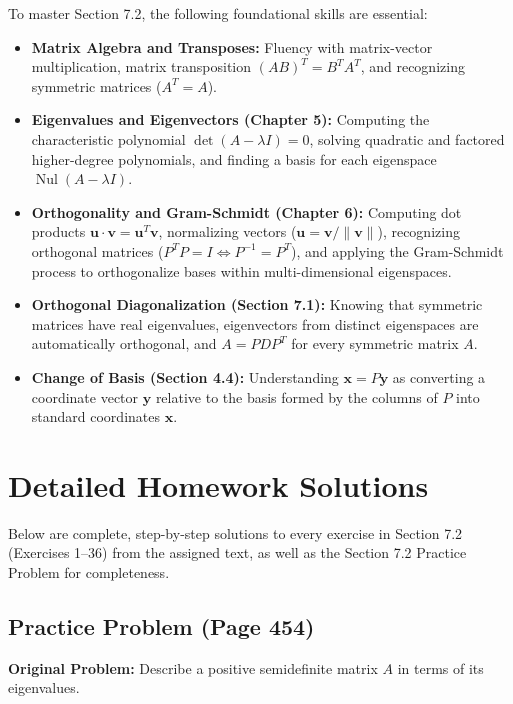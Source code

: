 \documentclass[11pt, letterpaper]{article}
\theoremstyle{definition}
\theoremstyle{remark}
\begin{document}
To master Section 7.2, the following foundational skills are essential:
\begin{itemize}
    \item \textbf{Matrix Algebra and Transposes:} Fluency with matrix-vector multiplication, matrix transposition $(AB)^T = B^T A^T$, and recognizing symmetric matrices ($A^T = A$).
    \item \textbf{Eigenvalues and Eigenvectors (Chapter 5):} Computing the characteristic polynomial $\det(A - \lambda I) = 0$, solving quadratic and factored higher-degree polynomials, and finding a basis for each eigenspace $\operatorname{Nul}(A - \lambda I)$.
    \item \textbf{Orthogonality and Gram-Schmidt (Chapter 6):} Computing dot products $\mathbf{u} \cdot \mathbf{v} = \mathbf{u}^T \mathbf{v}$, normalizing vectors ($\mathbf{u} = \mathbf{v}/\|\mathbf{v}\|$), recognizing orthogonal matrices ($P^T P = I \iff P^{-1} = P^T$), and applying the Gram-Schmidt process to orthogonalize bases within multi-dimensional eigenspaces.
    \item \textbf{Orthogonal Diagonalization (Section 7.1):} Knowing that symmetric matrices have real eigenvalues, eigenvectors from distinct eigenspaces are automatically orthogonal, and $A = P D P^T$ for every symmetric matrix $A$.
    \item \textbf{Change of Basis (Section 4.4):} Understanding $\mathbf{x} = P\mathbf{y}$ as converting a coordinate vector $\mathbf{y}$ relative to the basis formed by the columns of $P$ into standard coordinates $\mathbf{x}$.
\end{itemize}

\newpage

\section{Detailed Homework Solutions}

Below are complete, step-by-step solutions to every exercise in Section 7.2 (Exercises 1--36) from the assigned text, as well as the Section 7.2 Practice Problem for completeness.

\subsection*{Practice Problem (Page 454)}
\textbf{Original Problem:} Describe a positive semidefinite matrix $A$ in terms of its eigenvalues.
\end{document}
